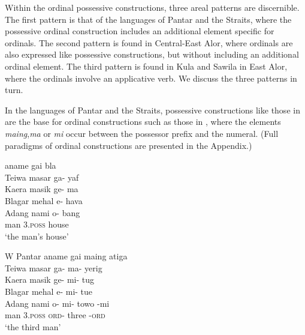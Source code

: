 Within the ordinal possessive constructions, three areal patterns are discernible. The first pattern is that of the languages of Pantar and the Straits, where the possessive ordinal construction includes an additional element specific for ordinals. The second pattern is found in Central-East Alor, where ordinals are also expressed like possessive constructions, but without including an additional ordinal element. The third pattern is found in Kula and Sawila in East Alor, where the ordinals involve an applicative verb. We discuss the three patterns in turn.

In the languages of Pantar and the Straits, possessive constructions like those in  are the base for ordinal constructions such as those in , where the elements \textit{maing},\textit{ma} or \textit{mi} occur between the possessor prefix and the numeral. (Full paradigms of ordinal constructions are presented in the Appendix.) 


\let\eachwordone=\itshape
\let\eachwordtwo=\itshape
\let\eachwordthree=\itshape
\let\eachwordfour=\itshape
\let\eachwordfive=\itshape 

\ea\label{bkm:Ref342649616}
    aname    gai    bla\\
  {\upshape Teiwa}      masar    ga-    yaf\\
  {\upshape Kaera}      masik    ge-    ma\\
  {\upshape Blagar}      mehal    {\textglotstop}e-    hava\\
  {\upshape Adang}       nami    o-    bang\\
   { }        man   \textsc{3.poss}  house  \\
\glt `the man's house'  \\ 
\z

\ea
\label{bkm:Ref342649632}
\gllllll
      {\upshape W Pantar}     aname  gai  maing  atiga \\  
      {\upshape Teiwa}          masar  ga-  ma-  yerig \\
      {\upshape Kaera}          masik  ge-  mi-  tug \\
      {\upshape Blagar}         mehal {\textglotstop}e-  mi-  tue  \\
      {\upshape Adang}          nami  o-  mi-  towo  {}-mi \\      
      { }            man \textsc{3.poss}  \textsc{ord-} three  -\textsc{ord} \\
\glt  `the third man'
\z


